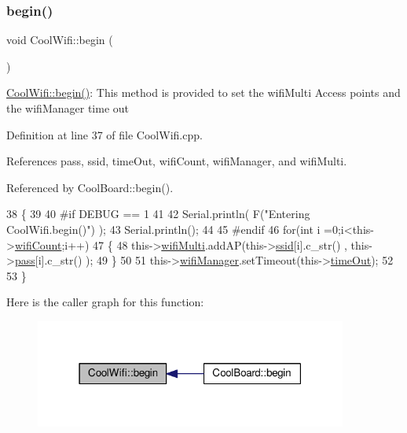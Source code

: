 \subsubsection{\texorpdfstring{begin()}{begin()}}
{\footnotesize\ttfamily void Cool\+Wifi\+::begin (\begin{DoxyParamCaption}{ }\end{DoxyParamCaption})}

\hyperlink{classCoolWifi_a46942fed90e475112cc10b78a32e7aaa}{Cool\+Wifi\+::begin()}\+: This method is provided to set the wifi\+Multi Access points and the wifi\+Manager time out 

Definition at line 37 of file Cool\+Wifi.\+cpp.



References pass, ssid, time\+Out, wifi\+Count, wifi\+Manager, and wifi\+Multi.



Referenced by Cool\+Board\+::begin().


\begin{DoxyCode}
38 \{ 
39 
40 \textcolor{preprocessor}{#if DEBUG == 1 }
41 
42     Serial.println( F(\textcolor{stringliteral}{"Entering CoolWifi.begin()"}) );
43     Serial.println();
44 
45 \textcolor{preprocessor}{#endif}
46     \textcolor{keywordflow}{for}(\textcolor{keywordtype}{int} i =0;i<this->\hyperlink{classCoolWifi_ab133bd92fcb895b884deecd6678592e4}{wifiCount};i++)
47     \{
48          this->\hyperlink{classCoolWifi_a7862a8c0d7239877e2956c14a368aab8}{wifiMulti}.addAP(this->\hyperlink{classCoolWifi_a893b21d0fed821438733bba2e73fb4c2}{ssid}[i].c\_str() , this->\hyperlink{classCoolWifi_a0c3332a149245aaad060b32593a54c9b}{pass}[i].c\_str() );    
49     \}
50     
51     this->\hyperlink{classCoolWifi_a80dd24fdc56e863f5eb9947dd65a433a}{wifiManager}.setTimeout(this->\hyperlink{classCoolWifi_a952111605f25156588b5632caaba1c6f}{timeOut});  
52     
53 \}
\end{DoxyCode}
Here is the caller graph for this function\+:
\nopagebreak
\begin{figure}[H]
\begin{center}
\leavevmode
\includegraphics[width=291pt]{classCoolWifi_a46942fed90e475112cc10b78a32e7aaa_icgraph}
\end{center}
\end{figure}
\mbox{\label{classCoolWifi_a4eb2f6b9b09dd588964b88b6c70122c0}} 

